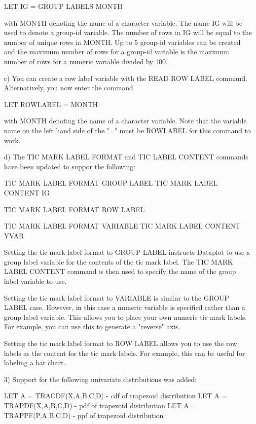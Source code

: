 {          LET IG = GROUP LABELS MONTH

       with MONTH denoting the name of a character variable.
       The name IG will be used to denote a group-id variable.
       The number of rows in IG will be equal to the number of
       unique rows in MONTH.  Up to 5 group-id variables can be
       created and the maximum number of rows for a group-id
       variable is the maximum number of rows for a numeric
       variable divided by 100.

    c) You can create a row label variable with the READ ROW LABEL
       command.  Alternatively, you now enter the command

           LET ROWLABEL = MONTH

       with MONTH denoting the name of a character variable.
       Note that the variable name on the left hand side of the
       "=" must be ROWLABEL for this command to work.

    d) The TIC MARK LABEL FORMAT and TIC LABEL CONTENT commands
       have been updated to suppor the following:

           TIC MARK LABEL FORMAT GROUP LABEL
           TIC MARK LABEL CONTENT IG

           TIC MARK LABEL FORMAT ROW LABEL

           TIC MARK LABEL FORMAT VARIABLE
           TIC MARK LABEL CONTENT YVAR

      Setting the tic mark label format to GROUP LABEL instructs
      Dataplot to use a group label variable for the contents
      of the tic mark label.  The TIC MARK LABEL CONTENT command
      is then used to specify the name of the group label variable
      to use.

      Setting the tic mark label format to VARIABLE is similar to
      the GROUP LABEL case.  However,  in this case a numeric
      variable is specified rather than a group label variable.
      This allows you to place your own numeric tic mark labels.
      For example, you can use this to generate a "reverse" axis.

      Setting the tic mark label format to ROW LABEL allows you
      to use the row labels as the content for the tic mark labels.
      For example, this can be useful for labeling a bar chart.

 3) Support for the following univariate distributions was added:

       LET A = TRACDF(X,A,B,C,D)   - cdf of trapezoid distribution
       LET A = TRAPDF(X,A,B,C,D)   - pdf of trapezoid distribution
       LET A = TRAPPF(P,A,B,C,D)   - ppf of trapezoid distribution

}
